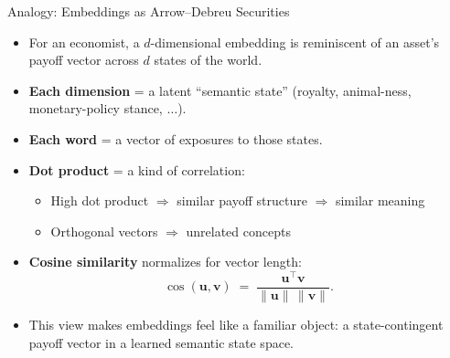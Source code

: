 \begin{frame}{Analogy: Embeddings as Arrow--Debreu Securities}
\begin{itemize}
\item For an economist, a $d$-dimensional embedding is reminiscent of an asset's payoff vector across $d$ states of the world.

\medskip
\item \textbf{Each dimension} = a latent ``semantic state'' (royalty, animal-ness, monetary-policy stance, $\ldots$).

\medskip
\item \textbf{Each word} = a vector of exposures to those states.

\medskip
\item \textbf{Dot product} = a kind of correlation:
\begin{itemize}
    \item High dot product $\Rightarrow$ similar payoff structure $\Rightarrow$ similar meaning
    \item Orthogonal vectors $\Rightarrow$ unrelated concepts
\end{itemize}

\medskip
\item \textbf{Cosine similarity} normalizes for vector length:
\[
   \cos(\mathbf{u}, \mathbf{v}) \;=\; \frac{\mathbf{u}^{\top}\mathbf{v}}{\|\mathbf{u}\|\,\|\mathbf{v}\|}.
\]

\medskip
\item This view makes embeddings feel like a familiar object: a state-contingent payoff vector in a learned semantic state space.
\end{itemize}
\end{frame}

